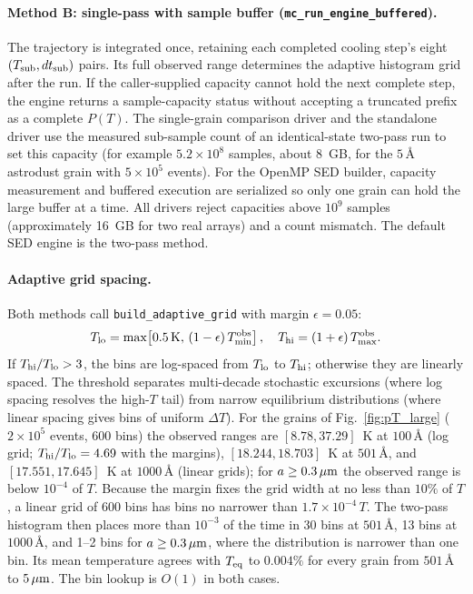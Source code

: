 \documentclass{my_memo}
\newcommand{\Teq}{T_{\rm eq}}
\newcommand{\umc}{\,\mu{\rm m}}
\begin{document}
\paragraph{Method B: single-pass with sample buffer
(\texttt{mc\_run\_engine\_buffered}).}
The trajectory is integrated once, retaining each completed cooling
step's eight $(T_{\rm sub},dt_{\rm sub})$ pairs. Its full observed
range determines the adaptive histogram grid after the run. If the
caller-supplied capacity cannot hold the next complete step, the
engine returns a sample-capacity status without accepting a truncated
prefix as a complete $P(T)$. The single-grain comparison driver and the
standalone driver use the measured sub-sample count of an
identical-state two-pass run to set this capacity (for example
$5.2\times10^8$ samples, about 8~GB, for the $5\,\textrm{\AA}$
astrodust grain with $5\times10^5$ events). For the OpenMP SED builder,
capacity measurement and buffered execution are serialized so only one
grain can hold the large buffer at a time. All drivers reject
capacities above $10^9$ samples (approximately 16~GB for two real
arrays) and a count mismatch. The default SED engine is the two-pass
method.

\paragraph{Adaptive grid spacing.}
Both methods call \verb|build_adaptive_grid| with margin $\epsilon=0.05$:
\begin{equation}
T_{\rm lo} = \max\!\left[0.5\,{\rm K},\,(1-\epsilon)\,T_{\rm min}^{\rm obs}\right], \quad
T_{\rm hi} = (1+\epsilon)\,T_{\rm max}^{\rm obs}.
\end{equation}
If $T_{\rm hi}/T_{\rm lo} > 3$, the bins are log-spaced from $T_{\rm lo}$
to $T_{\rm hi}$; otherwise they are linearly spaced. The threshold
separates multi-decade stochastic excursions (where log spacing
resolves the high-$T$ tail) from narrow equilibrium distributions
(where linear spacing gives bins of uniform $\Delta T$). For the grains
of Fig.~\ref{fig:pT_large} ($2\times10^5$ events, 600 bins) the
observed ranges are $[8.78, 37.29]$~K at $100\,\textrm{\AA}$ (log
grid; $T_{\rm hi}/T_{\rm lo}=4.69$ with the margins),
$[18.244, 18.703]$~K at $501\,\textrm{\AA}$, and $[17.551, 17.645]$~K
at $1000\,\textrm{\AA}$ (linear grids); for $a\ge0.3\umc$ the observed
range is below $10^{-4}$ of $T$. Because the margin fixes the grid
width at no less than $10\%$ of $T$, a linear grid of 600 bins has bins
no narrower than $1.7\times10^{-4}\,T$. The two-pass histogram then
places more than $10^{-3}$ of the time in 30 bins at
$501\,\textrm{\AA}$, 13 bins at $1000\,\textrm{\AA}$, and 1--2 bins for
$a\ge0.3\umc$, where the distribution is narrower than one bin. Its
mean temperature agrees with $\Teq$ to $0.004\%$ for every grain from
$501\,\textrm{\AA}$ to $5\umc$. The bin lookup is $O(1)$ in both cases.
\end{document}
